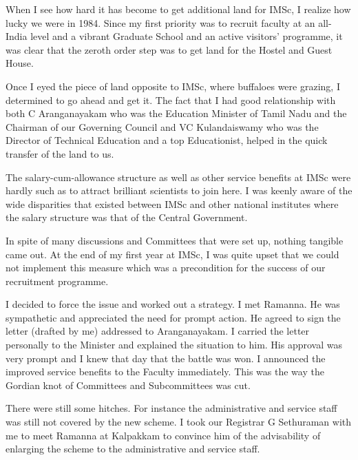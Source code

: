When I see how hard it has become to get additional land for IMSc, I 
realize how lucky we were in 1984. Since my first priority was to 
recruit faculty at an all-India level and a vibrant Gra\-duate School and 
an active visitors' programme, it was clear that the zeroth order step 
was to get land for the Hostel and Guest House.

Once I eyed the piece of land opposite to IMSc, where buffa\-loes were 
grazing, I determined to go ahead and get it. The fact that I had good 
relationship with both C Aranganayakam who was the Education Minister of 
Tamil Nadu and the Chairman of our Governing Council and VC 
Kulandaiswamy who was the Dire\-ctor of Technical Education and a top 
Educationist, helped in the quick transfer of the land to us.

The salary-cum-allowance structure as well as other service benefits at 
IMSc were hardly such as to attract brilliant scientists to join here. I 
was keenly aware of the wide disparities that existed between IMSc and 
other national institutes where the salary structure was that of the 
Central Government.

\vspace{.1cm}

In spite of many discussions and Committees that were set up, nothing 
tangible came out. At the end of my first year at IMSc, I was quite 
upset that we could not implement this measure which was a precondition 
for the success of our recruitment programme.

\vspace{.1cm}

I decided to force the issue and worked out a strategy. I met Ramanna. 
He was sympathetic and appreciated the need for prompt action. He agreed 
to sign the letter (drafted by me) addressed to Aranganayakam. I carried 
the letter personally to the Minister and explained the situation to 
him. His approval was very prompt and I knew that day that the battle 
was won. I announced the improved service benefits to the Faculty 
immediately. This was the way the Gordian knot of Committees and 
Subcommittees was cut.

\vspace{.1cm}

There were still some hitches. For instance the administrative and 
service staff was still not covered by the new scheme. I took our 
Registrar G Sethuraman with me to meet Ramanna at Kalpakkam to convince 
him of the advisability of enlarging the scheme to the administrative 
and service staff.

